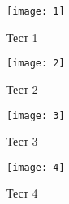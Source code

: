 \documentclass[spec, och, labwork]{shiza}
\begin{document}
        \begin{figure}[H]
            \centering      %
            \texttt{[image: 1]}
            \caption{Тест 1}
            \label{fig:image1}
        \end{figure}
        
        \begin{figure}[H]
            \centering      %
            \texttt{[image: 2]}
            \caption{Тест 2}
            \label{fig:image1}
        \end{figure}

        \begin{figure}[H]
            \centering      %
            \texttt{[image: 3]}
            \caption{Тест 3}
            \label{fig:image1}
        \end{figure}

        \begin{figure}[H]
            \centering      %
            \texttt{[image: 4]}
            \caption{Тест 4}
            \label{fig:image1}
        \end{figure}
\end{document}
